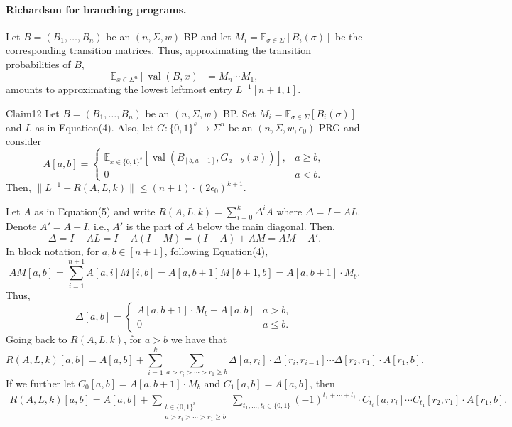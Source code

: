 \paragraph{Richardson for branching programs.} Let $B=(B_1,\ldots,B_n)$ be an $(n,\Sigma,w)$ BP and let $M_i=\mathbb E_{\sigma\in\Sigma}[B_i(\sigma)]$ be the corresponding transition matrices. Thus, approximating the transition probabilities of $B$,
\[\mathbb E_{x\in\Sigma^n}[\operatorname{val}(B,x)]=M_n\cdots M_1,\]
amounts to approximating the lowest leftmost entry $L^{-1}[n+1,1]$.
\begin{authorclaim}{Claim12}
Let $B=(B_1,\ldots,B_n)$ be an $(n,\Sigma,w)$ BP. Set $M_i=\mathbb E_{\sigma\in\Sigma}[B_i(\sigma)]$ and $L$ as in Equation(4). Also, let $G:\{0,1\}^s\to\Sigma^n$ be an $(n,\Sigma,w,\epsilon_0)$ PRG and consider
\begin{equation}\tag{5}A[a,b]=\begin{cases}\mathbb E_{x\in\{0,1\}^s}[\operatorname{val}(B_{[b,a-1]},G_{a-b}(x))],&a\ge b,\\0&a<b.\end{cases}\end{equation}
Then, $\|L^{-1}-R(A,L,k)\|\le(n+1)\cdot(2\epsilon_0)^{k+1}$.
\end{authorclaim}
Let $A$ as in Equation(5) and write $R(A,L,k)=\sum_{i=0}^k\Delta^iA$ where $\Delta=I-AL$. Denote $A'=A-I$, i.e., $A'$ is the part of $A$ below the main diagonal. Then,
\[\Delta=I-AL=I-A(I-M)=(I-A)+AM=AM-A'.\]
In block notation, for $a,b\in[n+1]$, following Equation(4),
\[AM[a,b]=\sum_{i=1}^{n+1}A[a,i]M[i,b]=A[a,b+1]M[b+1,b]=A[a,b+1]\cdot M_b.\]
Thus,
\begin{equation}\tag{6}\Delta[a,b]=\begin{cases}A[a,b+1]\cdot M_b-A[a,b]&a>b,\\0&a\le b.\end{cases}\end{equation}
Going back to $R(A,L,k)$, for $a>b$ we have that
\begin{equation}\tag{7}R(A,L,k)[a,b]=A[a,b]+\sum_{i=1}^k\sum_{a>r_i>\cdots>r_1\ge b}\Delta[a,r_i]\cdot\Delta[r_i,r_{i-1}]\cdots\Delta[r_2,r_1]\cdot A[r_1,b].\end{equation}
If we further let $C_0[a,b]=A[a,b+1]\cdot M_b$ and $C_1[a,b]=A[a,b]$, then
\begin{equation}\tag{8}\begin{aligned}R(A,L,k)[a,b]=A[a,b]+\sum_{\substack{t\in\{0,1\}^i\\a>r_i>\cdots>r_1\ge b}}\sum_{t_1,\ldots,t_i\in\{0,1\}}(-1)^{t_1+\cdots+t_i}\cdot C_{t_i}[a,r_i]\cdots C_{t_1}[r_2,r_1]\cdot A[r_1,b].\end{aligned}\end{equation}
